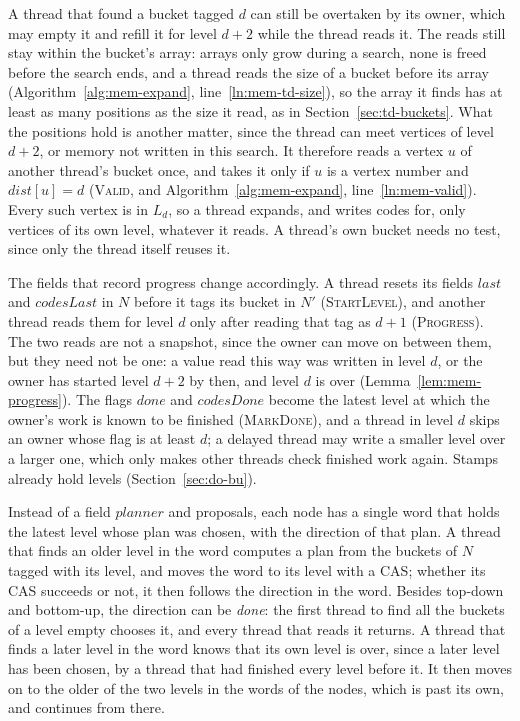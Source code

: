 A thread that found a bucket tagged $d$ can still be overtaken by its owner, which may empty it and refill it for level $d+2$ while the thread reads it. The reads still stay within the bucket's array: arrays only grow during a search, none is freed before the search ends, and a thread reads the size of a bucket before its array (Algorithm~\ref{alg:mem-expand}, line~\ref{ln:mem-td-size}), so the array it finds has at least as many positions as the size it read, as in Section~\ref{sec:td-buckets}. What the positions hold is another matter, since the thread can meet vertices of level $d+2$, or memory not written in this search. It therefore reads a vertex $u$ of another thread's bucket once, and takes it only if $u$ is a vertex number and $\mathit{dist}[u] = d$ (\textsc{Valid}, and Algorithm~\ref{alg:mem-expand}, line~\ref{ln:mem-valid}). Every such vertex is in $L_d$, so a thread expands, and writes codes for, only vertices of its own level, whatever it reads. A thread's own bucket needs no test, since only the thread itself reuses it.

The fields that record progress change accordingly. A thread resets its fields $\mathit{last}$ and $\mathit{codesLast}$ in $N$ before it tags its bucket in $N'$ (\textsc{StartLevel}), and another thread reads them for level $d$ only after reading that tag as $d+1$ (\textsc{Progress}). The two reads are not a snapshot, since the owner can move on between them, but they need not be one: a value read this way was written in level $d$, or the owner has started level $d+2$ by then, and level $d$ is over (Lemma~\ref{lem:mem-progress}). The flags $\mathit{done}$ and $\mathit{codesDone}$ become the latest level at which the owner's work is known to be finished (\textsc{MarkDone}), and a thread in level $d$ skips an owner whose flag is at least $d$; a delayed thread may write a smaller level over a larger one, which only makes other threads check finished work again. Stamps already hold levels (Section~\ref{sec:do-bu}).

Instead of a field $\mathit{planner}$ and proposals, each node has a single word that holds the latest level whose plan was chosen, with the direction of that plan. A thread that finds an older level in the word computes a plan from the buckets of $N$ tagged with its level, and moves the word to its level with a CAS; whether its CAS succeeds or not, it then follows the direction in the word. Besides top-down and bottom-up, the direction can be \emph{done}: the first thread to find all the buckets of a level empty chooses it, and every thread that reads it returns. A thread that finds a later level in the word knows that its own level is over, since a later level has been chosen, by a thread that had finished every level before it. It then moves on to the older of the two levels in the words of the nodes, which is past its own, and continues from there.

